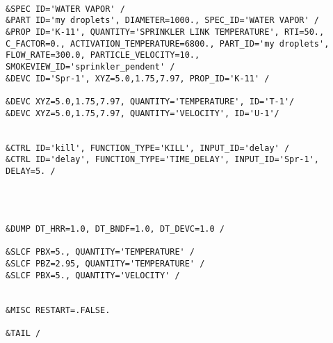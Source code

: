 \begin{lstlisting}[emptylines=0,basicstyle=\tiny]
 
&SPEC ID='WATER VAPOR' /
&PART ID='my droplets', DIAMETER=1000., SPEC_ID='WATER VAPOR' /
&PROP ID='K-11', QUANTITY='SPRINKLER LINK TEMPERATURE', RTI=50., C_FACTOR=0., ACTIVATION_TEMPERATURE=6800., PART_ID='my droplets', FLOW_RATE=300.0, PARTICLE_VELOCITY=10., SMOKEVIEW_ID='sprinkler_pendent' /
&DEVC ID='Spr-1', XYZ=5.0,1.75,7.97, PROP_ID='K-11' /

&DEVC XYZ=5.0,1.75,7.97, QUANTITY='TEMPERATURE', ID='T-1'/
&DEVC XYZ=5.0,1.75,7.97, QUANTITY='VELOCITY', ID='U-1'/


&CTRL ID='kill', FUNCTION_TYPE='KILL', INPUT_ID='delay' /
&CTRL ID='delay', FUNCTION_TYPE='TIME_DELAY', INPUT_ID='Spr-1', DELAY=5. /




&DUMP DT_HRR=1.0, DT_BNDF=1.0, DT_DEVC=1.0 /

&SLCF PBX=5., QUANTITY='TEMPERATURE' /
&SLCF PBZ=2.95, QUANTITY='TEMPERATURE' /
&SLCF PBX=5., QUANTITY='VELOCITY' /


&MISC RESTART=.FALSE.

&TAIL /


\end{lstlisting}

